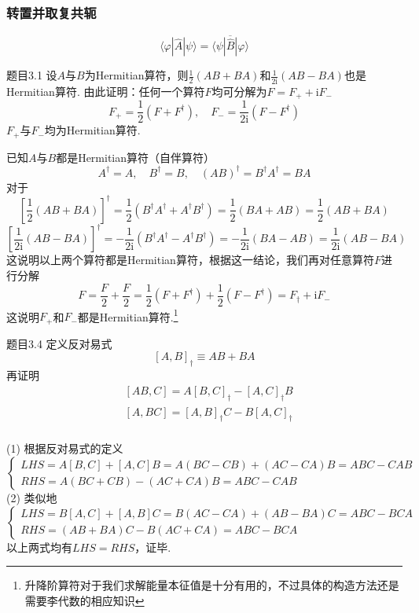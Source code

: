 \subsubsection{转置并取复共轭}
$$
    \langle\varphi|\hat{A}|\psi\rangle=\overline{\langle\psi|\hat{B}|\varphi\rangle}
$$

\begin{question}{题目3.1}
    设$A$与$B$为Hermitian算符，则$\frac{1}{2}(AB+BA)$和$\frac{1}{2\mathrm{i}}(AB-BA)$也是Hermitian算符. 由此证明：任何一个算符$F$均可分解为$F=F_{+}+\mathrm{i}F_{-}$
    $$
        F_{+}=\frac{1}{2}(F+F^{\dagger}),\quad
        F_{-}=\frac{1}{2\mathrm{i}}(F-F^{\dagger})
    $$
    $F_{+}$与$F_{-}$均为Hermitian算符.
\end{question}
\begin{solution}
    已知$A$与$B$都是Hermitian算符（自伴算符）
    $$
        A^\dagger = A, \quad
        B^\dagger = B, \quad
        (AB)^{\dagger}=B^{\dagger}A^{\dagger}=BA
    $$
    对于
    $$
        \left[\frac{1}{2}(AB+BA)\right]^\dagger
        = \frac{1}{2}\left(B^\dagger A^\dagger + A^\dagger B^\dagger\right)
        = \frac{1}{2}(BA+AB)
        = \frac{1}{2}(AB+BA)
    $$
    $$
        \left[\frac{1}{2\mathrm{i}}(AB-BA)\right]^\dagger
        = -\frac{1}{2\mathrm{i}}\left(B^{\dagger}A^{\dagger} - A^{\dagger}B^{\dagger}\right)
        = -\frac{1}{2\mathrm{i}}\left(BA-AB\right)
        = \frac{1}{2\mathrm{i}}\left(AB-BA\right)
    $$
    这说明以上两个算符都是Hermitian算符，根据这一结论，我们再对任意算符$F$进行分解
    $$
        F = \frac{F}{2}+\frac{F}{2}
        = \frac{1}{2}\left(F+F^\dagger\right)+\frac{1}{2}\left(F-F^\dagger\right)
        = F_{\dagger}+\mathrm{i}F_{-}
    $$
    这说明$F_{+}$和$F_{-}$都是Hermitian算符.\footnote{升降阶算符对于我们求解能量本征值是十分有用的，不过具体的构造方法还是需要李代数的相应知识}
\end{solution}



\begin{question}{题目3.4}
    定义反对易式
    $$
        [A, B]_{\dagger} \equiv AB+BA
    $$
    再证明
    $$
        \begin{aligned}
             & [AB, C] = A[B, C]_{\dagger} - [A, C]_{\dagger}B \\
             & [A, BC] = [A, B]_{\dagger}C - B[A, C]_{\dagger} \\
        \end{aligned}
    $$
\end{question}
\begin{solution}
    (1) 根据反对易式的定义
    $$
        \begin{cases}
            LHS=A[B,C]+[A,C]B=A(BC-CB)+(AC-CA)B=ABC-CAB \\
            RHS=A(BC+CB)-(AC+CA)B=ABC-CAB
        \end{cases}
    $$
    (2) 类似地
    $$
        \begin{cases}
            LHS=B[A,C]+[A,B]C=B(AC-CA)+(AB-BA)C=ABC-BCA \\
            RHS=(AB+BA)C-B(AC+CA)=ABC-BCA
        \end{cases}
    $$
    以上两式均有$LHS=RHS$，证毕.
\end{solution}


